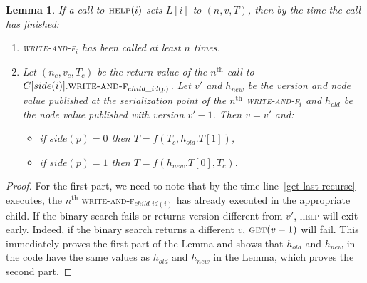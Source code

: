\documentclass[a4paper,11pt]{article}
\newtheorem{lemma}{Lemma}
\newcommand{\fn}[1]{\textsc{#1}}
\begin{document}
\begin{lemma}
	If a call to $\fn{help}(i)$ sets $L[i]$ to $(n, v, T)$, then by the time the call has finished: \label{last-is-correct}
\begin{enumerate}
	\item \fn{write-and-f$_i$} has been called at least $n$ times.
	\item Let $(n_c, v_c, T_c)$ be the return value of the $n^{\text{th}}$ call to $C[side(i)].\fn{write-and-f}_{child\_id(p)}$. Let $v'$ and $h_{new}$ be the version and node value published at the serialization point of the $n^{\text{th}}$
		\fn{write-and-f$_i$} and $h_{old}$ be the node value published with version $v'-1$. Then $v = v'$ and:
		\begin{itemize}
			\item if $side(p) = 0$ then $T = f(T_c, h_{old}.T[1])$,
			\item if $side(p) = 1$ then $T = f(h_{new}.T[0], T_c)$.
		\end{itemize}
\end{enumerate}
\end{lemma}
\begin{proof}
	For the first part, we need to note that by the time line~\ref{get-last-recurse} executes, the $n^{\text{th}}$ \fn{write-and-f$_{child\_id(i)}$} has already executed in the appropriate child.
	If the binary search fails or returns version different from $v'$, \fn{help} will exit early. Indeed, if the binary search returns a different $v$, $\fn{get}(v-1)$ will fail.
	This immediately proves the first part of the Lemma and shows that $h_{old}$ and $h_{new}$ in the code have the same values as $h_{old}$ and $h_{new}$ in the Lemma, which proves the second part.
\end{proof}
\end{document}
